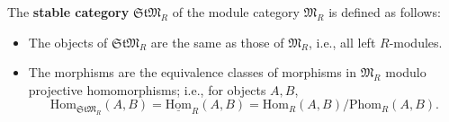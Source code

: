 The \textbf{stable category} $\mathfrak{StM}_R$ of the module category $\mathfrak{M}_R$ is defined as follows:
\begin{itemize}
\item The objects of $\mathfrak{StM}_R$ are the same as those of $\mathfrak{M}_R$, i.e., all left $R$-modules.
\item The morphisms are the equivalence classes of morphisms in $\mathfrak{M}_R$ modulo projective homomorphisms; i.e., for objects $A, B$,
$$
\mathrm{Hom}_{\mathfrak{StM}_R}(A, B) = \underline{\mathrm{Hom}}_R(A, B) = \mathrm{Hom}_R(A, B) / \mathrm{Phom}_R(A, B).
$$
\end{itemize}
